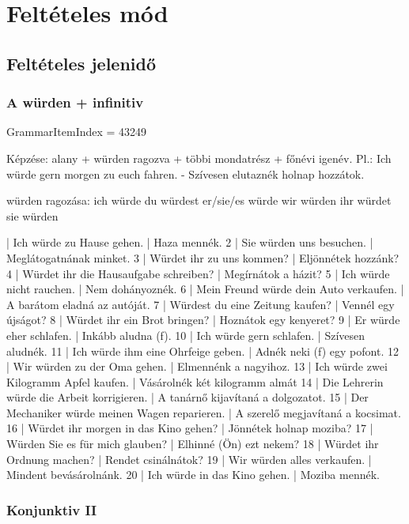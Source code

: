 \documentclass{article}
\newenvironment{desc}{\verbatim}{\endverbatim}
\newenvironment{exmp}{\verbatim}{\endverbatim}
\begin{document}
\section{Feltételes mód}

\subsection{Feltételes jelenidő}

\subsubsection{A würden + infinitiv}

GrammarItemIndex = 43249

\begin{desc}
Képzése: alany + würden ragozva + többi mondatrész + főnévi igenév.
Pl.: Ich würde gern morgen zu euch fahren. - Szívesen elutaznék holnap hozzátok.

würden ragozása:
ich würde
du würdest
er/sie/es würde
wir würden
ihr würdet
sie würden
\end{desc}

\begin{exmp}
1 | Ich würde zu Hause gehen. | Haza mennék.
2 | Sie würden uns besuchen. | Meglátogatnának minket.
3 | Würdet ihr zu uns kommen? | Eljönnétek hozzánk?
4 | Würdet ihr die Hausaufgabe schreiben? | Megírnátok a házit?
5 | Ich würde nicht rauchen. | Nem dohányoznék.
6 | Mein Freund würde dein Auto verkaufen. | A barátom eladná az autóját.
7 | Würdest du eine Zeitung kaufen? | Vennél egy újságot?
8 | Würdet ihr ein Brot bringen? | Hoznátok egy kenyeret?
9 | Er würde eher schlafen. | Inkább aludna (f).
10 | Ich würde gern schlafen. | Szívesen aludnék.
11 | Ich würde ihm eine Ohrfeige geben. | Adnék neki (f) egy pofont.
12 | Wir würden zu der Oma gehen. | Elmennénk a nagyihoz.
13 | Ich würde zwei Kilogramm Apfel kaufen. | Vásárolnék két kilogramm almát
14 | Die Lehrerin würde die Arbeit korrigieren. | A tanárnő kijavítaná a dolgozatot.
15 | Der Mechaniker würde meinen Wagen reparieren. | A szerelő megjavítaná a kocsimat.
16 | Würdet ihr morgen in das Kino gehen? | Jönnétek holnap moziba?
17 | Würden Sie es für mich glauben? | Elhinné (Ön) ezt nekem?
18 | Würdet ihr Ordnung machen? | Rendet csinálnátok?
19 | Wir würden alles verkaufen. | Mindent bevásárolnánk.
20 | Ich würde in das Kino gehen. | Moziba mennék.
\end{exmp}

\subsubsection{Konjunktiv II}
\end{document}
